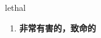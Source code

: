 
\begin{frame}
{\huge lethal}
\begin{center}
\begin{enumerate}\Large
  \item \textbf{非常有害的，致命的}
\end{enumerate}
\end{center}
\end{frame}
